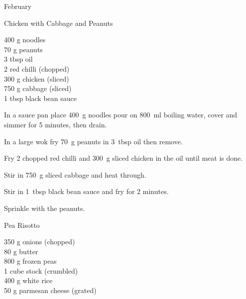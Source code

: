 \begin{menu}{February}
    \begin{recipe}{2}{Chicken with Cabbage and Peanuts}%
		\begin{ingredients}
		400 g noodles  \\
	70 g peanuts  \\
	3 tbsp oil  \\
	2  red chilli (chopped) \\
	300 g chicken (sliced) \\
	750 g cabbage (sliced) \\
	1 tbsp black bean sauce  \\
	
		\end{ingredients}
	
	
    \begin{instructions}
    \item 
    In a
    sauce pan
    place
    400~g  noodles
    pour on
    800~ml  boiling water,
    cover and simmer for 5 minutes, then drain.
  \item 
        In a large wok	fry
        70~g  peanuts
        in
        3~tbsp  oil
        then remove.
      \item 
        Fry 2 chopped red chilli
        and
        300~g sliced chicken
        in the oil until meat is done.
      \item 
        Stir in
        750~g sliced cabbage
        and heat through.
      \item 
        Stir in
        1~tbsp  black bean sauce
        and fry for 2 minutes.
      \item 
        Sprinkle with the peanuts.
      
    \end{instructions}
    \end{recipe}%
  
    \begin{recipe}{2}{Pea Risotto}%
		\begin{ingredients}
		350 g onions (chopped) \\
	80 g butter  \\
	800 g frozen peas  \\
	1 cube stock (crumbled) \\
	400 g white rice  \\
	50 g parmesan cheese (grated) \\
	
		\end{ingredients}
	

\end{recipe}
\end{menu}
